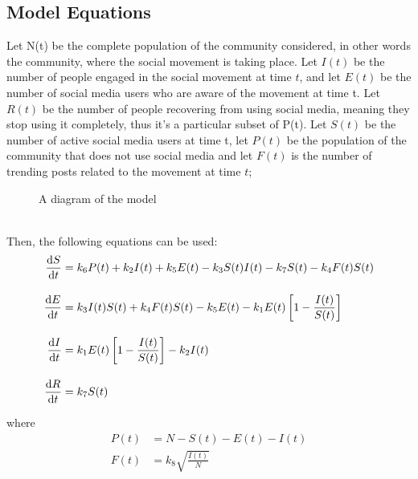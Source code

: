 \documentclass{article}
\begin{document}
    \subsection{Model Equations}
     Let N(t) be the complete population of the community considered, in other words the community, where the social movement is taking place.
     Let $I(t)$ be the number of people engaged in the social movement at time $t$, and let $E(t)$ be the number of social media users who are aware of the movement at time t. Let $R(t)$ be the number of people recovering from using social media, meaning they stop using it completely, thus it's a particular subset of P(t). Let $S(t)$ be the number of active social media users at time t, let $P(t)$ be the population of the community that does not use social media and let $F(t)$ is the number of trending posts related to the movement at time $t$;\\
     \begin{figure}
         \centering
        \caption{A diagram of the model}
    \end{figure}
    \\
    Then, the following equations can be used:
    \begin{subequations}
    \begin{align}            
        \diff St &= k_6 P(t) + k_2I(t) + k_5E(t) - k_3 {S(t)I(t)}- k_7S(t)-k_4 F(t)S(t)
        \\[10pt]
        \diff Et &= k_3 I(t)S(t) + k_4 F(t) S(t) - k_5E(t) - k_1E(t)\left[1 - \frac{I(t)}{S(t)}\right] 
        \\[10pt]
        \diff It &= k_1 E(t) \left[1 - \frac{I(t)}{S(t)}\right] - k_2I(t)
        \\[10pt]
        \diff Rt &= k_7S(t)
    \end{align}
    \end{subequations}
    
    where
    \begin{subequations}
    \begin{align}
        P(t) &= N - S(t) - E(t) - I(t)
        \\[10pt]
        F(t) &= k_8\sqrt{\frac{I(t)} N}
    \end{align}
    \end{subequations}
\end{document}

